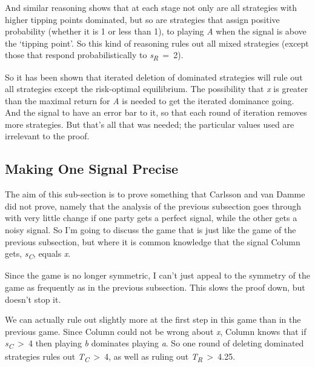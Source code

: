 \documentclass[
  12pt,
  letterpaper,
]{scrbook}
\begin{document}
And similar reasoning shows that at each stage not only are all
strategies with higher tipping points dominated, but so are strategies
that assign positive probability (whether it is 1 or less than 1), to
playing \emph{A} when the signal is above the `tipping point'. So this
kind of reasoning rules out all mixed strategies (except those that
respond probabilistically to \emph{s\textsubscript{R}}~=~2).

So it has been shown that iterated deletion of dominated strategies will
rule out all strategies except the risk-optimal equilibrium. The
possibility that \emph{x} is greater than the maximal return for
\emph{A} is needed to get the iterated dominance going. And the signal
to have an error bar to it, so that each round of iteration removes more
strategies. But that's all that was needed; the particular values used
are irrelevant to the proof.

\subsection{Making One Signal Precise}\label{sec-perfectri}

The aim of this sub-section is to prove something that Carlsson and van
Damme did not prove, namely that the analysis of the previous subsection
goes through with very little change if one party gets a perfect signal,
while the other gets a noisy signal. So I'm going to discuss the game
that is just like the game of the previous subsection, but where it is
common knowledge that the signal Column gets, \emph{s\textsubscript{C}},
equals \emph{x}.

Since the game is no longer symmetric, I can't just appeal to the
symmetry of the game as frequently as in the previous subsection. This
slows the proof down, but doesn't stop it.

We can actually rule out slightly more at the first step in this game
than in the previous game. Since Column could not be wrong about
\emph{x}, Column knows that if \emph{s\textsubscript{C}}~\textgreater~4
then playing \emph{b} dominates playing \emph{a}. So one round of
deleting dominated strategies rules out
\emph{T\textsubscript{C}}~\textgreater~4, as well as ruling out
\emph{T\textsubscript{R}}~\textgreater~4.25.
\end{document}

